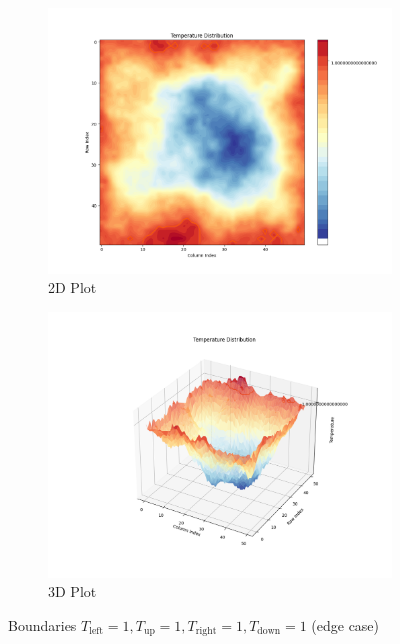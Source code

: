 \documentclass{article}
\begin{document}
\begin{figure}[H]
  \begin{subfigure}{0.45\textwidth}
    \includegraphics[width=\linewidth]{figures/Figure_7.png}
    \caption{2D Plot}
  \end{subfigure}
  \hfill
  \begin{subfigure}{0.45\textwidth}
    \includegraphics[width=\linewidth]{figures/Figure_8.png}
    \caption{3D Plot}
  \end{subfigure}
  \caption{Boundaries $T_{\text{left}}=1, T_{\text{up}}=1, T_{\text{right}}=1, T_{\text{down}}=1$ (edge case)}
\end{figure}
\end{document}
